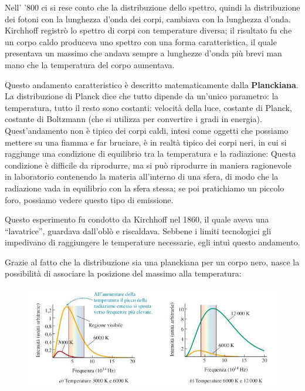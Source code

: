 Nell' '800 ci si rese conto che la distribuzione dello spettro, quindi la distribuzione dei fotoni con la lunghezza d'onda dei corpi, cambiava con la lunghezza d'onda. Kirchhoff registrò lo spettro di corpi con temperature diversa; il risultato fu che un corpo caldo produceva uno spettro con una forma caratteristica, il quale presentava un massimo che andava sempre a lunghezze d'onda più brevi man mano che la temperatura del corpo aumentava.

Questo andamento caratteristico è descritto matematicamente dalla \textbf{Planckiana}. La distribuzione di Planck dice che tutto dipende da un'unico parametro: la temperatura, tutto il resto sono costanti: velocità della luce, costante di Planck, costante di Boltzmann (che si utilizza per convertire i gradi in energia). Quest'andamento non è tipico dei corpi caldi, intesi come oggetti che possiamo mettere su una fiamma e far bruciare, è in realtà tipico dei corpi neri, in cui si raggiunge una condizione di equilibrio tra la temperatura e la radiazione: Questa condizione è difficile da riprodurre, ma si può riprodurre in maniera ragionevole in laboratorio contenendo la materia all'interno di una sfera, di modo che la radiazione vada in equilibrio con la sfera stessa; se poi pratichiamo un piccolo foro, possiamo vedere questo tipo di emissione.

Questo esperimento fu condotto da Kirchhoff nel 1860, il quale aveva una “lavatrice”, guardava dall'oblò e riscaldava. Sebbene i limiti tecnologici gli impedivano di raggiungere le temperature necessarie, egli intuì questo andamento. %

Grazie al fatto che la distribuzione sia una planckiana per un corpo nero, nasce la possibilità di associare la posizione del massimo alla temperatura: 

\begin{figure}[H]
   \centering
   \includegraphics[width=12cm]{immagini/legge_di_wien.png}
\end{figure}

